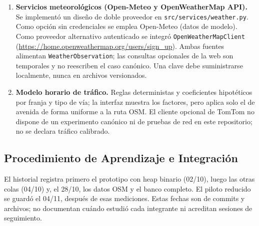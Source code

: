 \begin{enumerate}
    \item \textbf{Servicios meteorológicos (Open-Meteo y OpenWeatherMap API).} Se implementó un diseño de doble proveedor en \texttt{src/services/weather.py}. Como opción sin credenciales se emplea Open-Meteo (datos de modelo). Como proveedor alternativo autenticado se integró \texttt{OpenWeatherMapClient} (\url{https://home.openweathermap.org/users/sign_up}). Ambas fuentes alimentan \texttt{WeatherObservation}; las consultas opcionales de la web son temporales y no reescriben el caso canónico. Una clave debe suministrarse localmente, nunca en archivos versionados.
    \item \textbf{Modelo horario de tráfico.} Reglas deterministas y coeficientes hipotéticos por franja y tipo de vía; la interfaz muestra los factores, pero aplica solo el de avenida de forma uniforme a la ruta OSM. El cliente opcional de TomTom no dispone de un experimento canónico ni de pruebas de red en este repositorio; no se declara tráfico calibrado.
\end{enumerate}

\subsection{Procedimiento de Aprendizaje e Integración}
El historial registra primero el prototipo con heap binario (02/10), luego las otras colas (04/10) y, el 28/10, los datos OSM y el banco completo. El piloto reducido se guardó el 04/11, después de esas mediciones. Estas fechas son de commits y archivos; no documentan cuándo estudió cada integrante ni acreditan sesiones de seguimiento.

